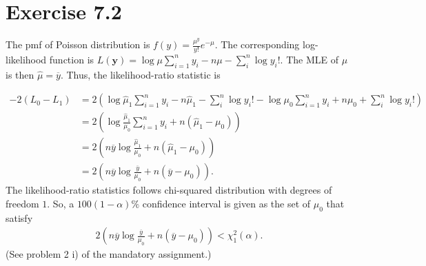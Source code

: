 \section*{Exercise 7.2}
The pmf of Poisson distribution is $f(y) = \frac{\mu^{y}}{y!}e^{-\mu}$. The corresponding log-likelihood function is $L(\bm{y}) = \log\mu\sum_{i=1}^{n}y_{i} - n\mu -\sum_{i}^{n}\log y_{i}!$. The MLE of $\mu$ is then $\widehat{\mu} = \overline{y}$. Thus, the likelihood-ratio statistic is

\begin{align*}
-2\left(L_{0} - L_{1}\right) &= 2\left(
\log\widehat{\mu}_{1}\sum_{i=1}^{n}y_{i} - n\widehat{\mu}_{1} -\sum_{i}^{n}\log y_{i}!
-\log\mu_{0}\sum_{i=1}^{n}y_{i} +n\mu_{0} +\sum_{i}^{n}\log y_{i}!
\right)\\
&= 2\left(\log\frac{\widehat{\mu}_{1}}{\mu_{0}}\sum_{i=1}^{n}y_{i} +n\left(\widehat{\mu}_{1} -\mu_{0}\right)\right)\\
&= 2\left(n\overline{y}\log\frac{\widehat{\mu}_{1}}{\mu_{0}} +n\left(\widehat{\mu}_{1} -\mu_{0}\right)\right)\\
&= 2\left(n\overline{y}\log\frac{\overline{y}}{\mu_{0}} +n\left(\overline{y} -\mu_{0}\right)\right).
\end{align*}
The likelihood-ratio statistics follows chi-squared distribution with degrees of freedom $1$. So, a $100(1-\alpha)\%$ confidence interval is given as the set of $\mu_{0}$ that satisfy
\begin{align*}
2\left(n\overline{y}\log\frac{\overline{y}}{\mu_{0}} +n\left(\overline{y} -\mu_{0}\right)\right) < \chi_{1}^{2}(\alpha).
\end{align*}
(See problem 2 i) of the mandatory assignment.)